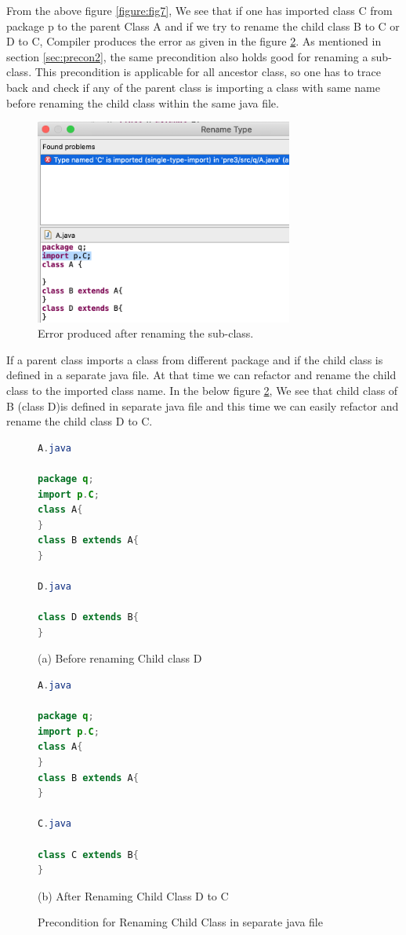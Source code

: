 From the above figure \ref{figure:fig7}, We see that if one has imported class C from  package  p to the parent Class A and if we try to rename the child class B to C or D to C, Compiler produces  the error as given in the figure \ref{figure:fig8}. As mentioned in  section \ref{sec:precon2}, the same precondition also holds good for renaming a sub-class. This precondition is applicable for all ancestor class, so one has to trace back and check if any of the parent class is importing a class with same name before renaming the child class within the same java file.
\begin{figure}[htbp]
\centerline{\includegraphics[width=85mm,scale=0.5]{precond3.png}}
\caption{Error produced after renaming the sub-class.}
\label{figure:fig8}
\end{figure}

If a parent class imports a class from different package and if the child class is defined in a separate java file. At that time we can refactor and rename the child class to the imported class name.
In the below figure \ref{figure:fig8}, We see that child class of B (class D)is defined in separate java file and this time we can easily refactor and rename the child class D to C.
\begin{figure}[th]
\centering
\begin{minipage}[t]{0.45\linewidth}
\begin{lstlisting}[language=java, basicstyle=\scriptsize\ttfamily,frame=single]	
A.java

package q;
import p.C;
class A{	
}
class B extends A{	
}

D.java

class D extends B{
}
\end{lstlisting}
\tiny{(a) Before renaming Child class D}
\end{minipage}
\hfill
\begin{minipage}[t]{0.45\linewidth}
\begin{lstlisting}[language=java, basicstyle=\scriptsize\ttfamily,frame=single]
A.java

package q;
import p.C;
class A{	
}
class B extends A{	
}

C.java

class C extends B{
}	
\end{lstlisting}
\tiny{(b) After Renaming Child Class D to C}
\end{minipage}
\caption{Precondition for Renaming Child Class in separate java file}
\label{figure:fig8}
\end{figure}